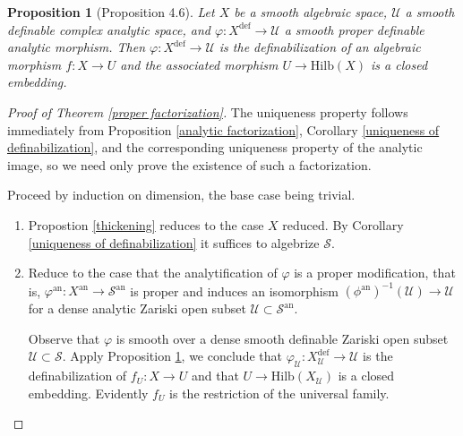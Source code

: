 \documentclass{amsart}
\newtheorem{proposition}[theorem]{Proposition}
\theoremstyle{definition}
\numberwithin{equation}{section}
\newcommand{\definable}{\mathrm{def}}
\newcommand{\analytic}{\mathrm{an}}
\begin{document}
\begin{proposition}[Proposition 4.6] \label{embedding into Hilb}
  Let $X$ be a smooth algebraic space,
  $\mathcal{U}$ a smooth definable complex analytic space,
  and $\varphi: X^{\definable} \to \mathcal{U}$ a smooth proper definable analytic morphism.
  Then $\varphi: X^{\definable} \to \mathcal{U}$ is the definabilization of an algebraic morphism $f: X \to U$ and
  the associated morphism $U \to \mathrm{Hilb}(X)$ is a closed embedding.
\end{proposition}

\begin{proof}[Proof of Theorem \ref{proper factorization}]
  The uniqueness property follows immediately from Proposition \ref{analytic factorization}, Corollary \ref{uniqueness of definabilization},
  and the corresponding uniqueness property of the analytic image, so we need only prove the existence of such a factorization.

  Proceed by induction on dimension, the base case being trivial.
  \begin{enumerate}
    \item 
    Propostion \ref{thickening} reduces to the case $X$ reduced.
    By Corollary \ref{uniqueness of definabilization} it suffices to algebrize $\mathcal{S}$.
    
    \item
    Reduce to the case that the analytification of $\varphi$ is a proper modification, that is, 
    $\varphi^\analytic: X^\analytic \to \mathcal{S}^\analytic$ is proper and induces an isomorphism 
    $(\phi^{\analytic})^{-1}(\mathcal{U})\to\mathcal{U}$ for a dense analytic Zariski open subset $\mathcal{U} \subset \mathcal{S}^{\analytic}$.

    Observe that $\varphi$ is smooth over a dense smooth definable Zariski open subset $\mathcal{U} \subset \mathcal{S}$.
    Apply Proposition \ref{embedding into Hilb}, we conclude that $\varphi_{\mathcal{U}} : X_{\mathcal{U}}^\definable \to \mathcal{U}$
    is the definabilization of $f_U: X \to U$ and that $U \to \mathrm{Hilb}(X_{\mathcal{U}})$ is a closed embedding.
    Evidently $f_U$ is the restriction of the universal family.


\end{enumerate}
\end{proof}
\end{document}
